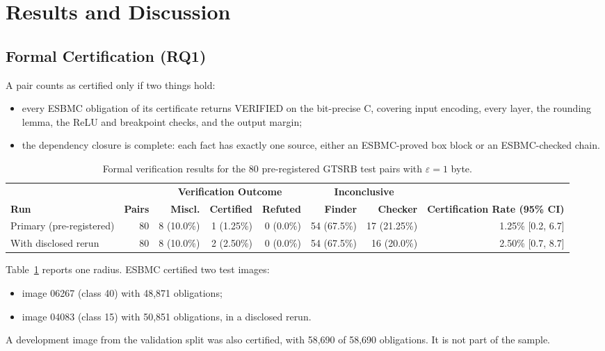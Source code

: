 \section{Results and Discussion}
\label{sec:results}

\subsection{Formal Certification (RQ1)}
A pair counts as certified only if two things hold:
\begin{itemize}
  \item every ESBMC obligation of its certificate returns VERIFIED on the bit-precise C, covering input encoding, every layer, the rounding lemma, the ReLU and breakpoint checks, and the output margin;
  \item the dependency closure is complete: each fact has exactly one source, either an ESBMC-proved box block or an ESBMC-checked chain.
\end{itemize}

\begin{table}[t]
\centering
\caption{Formal verification results for the 80 pre-registered GTSRB test pairs with $\varepsilon=1$ byte.}
\label{tab:formal}
\scriptsize
\renewcommand{\arraystretch}{1.15}
\setlength{\tabcolsep}{7pt}
\begin{tabular}{lrrrrrrr}
\toprule
& & \multicolumn{3}{c}{\textbf{Verification Outcome}}
& \multicolumn{2}{c}{\textbf{Inconclusive}}
& \\
\cmidrule(lr){3-5}
\cmidrule(lr){6-7}
\textbf{Run}
& \textbf{Pairs}
& \textbf{Miscl.}
& \textbf{Certified}
& \textbf{Refuted}
& \textbf{Finder}
& \textbf{Checker}
& \textbf{Certification Rate (95\% CI)} \\
\midrule

Primary (pre-registered)
& 80
& 8 (10.0\%)
& 1 (1.25\%)
& 0 (0.0\%)
& 54 (67.5\%)
& 17 (21.25\%)
& 1.25\% [0.2, 6.7] \\

With disclosed rerun
& 80
& 8 (10.0\%)
& 2 (2.50\%)
& 0 (0.0\%)
& 54 (67.5\%)
& 16 (20.0\%)
& 2.50\% [0.7, 8.7] \\

\bottomrule
\end{tabular}

\end{table}

Table~\ref{tab:formal} reports one radius. ESBMC certified two test images:
\begin{itemize}
  \item image 06267 (class 40) with 48,871 obligations;
  \item image 04083 (class 15) with 50,851 obligations, in a disclosed rerun.
\end{itemize}
A development image from the validation split was also certified, with 58,690 of 58,690 obligations. It is not part of the sample.

